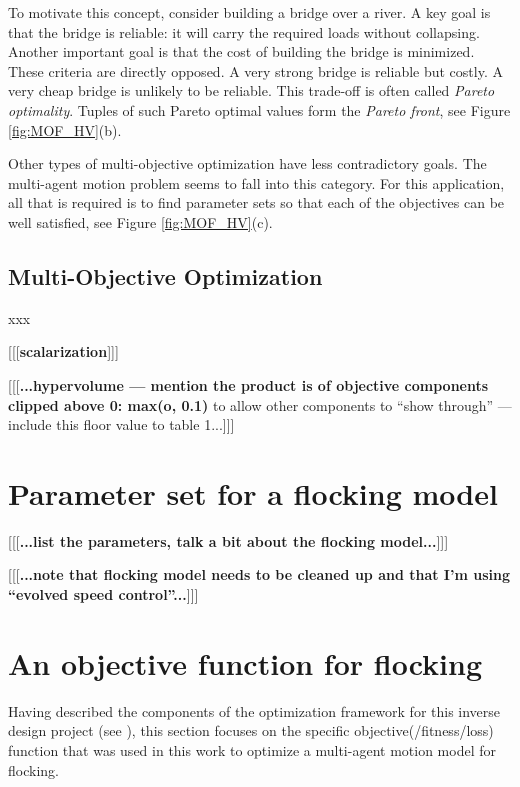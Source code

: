 \documentclass[letterpaper]{article}
\begin{document}
To motivate this concept, consider building a bridge over a river. A key goal is that the bridge is reliable: it will carry the required loads without collapsing. Another important goal is that the cost of building the bridge is minimized. These criteria are directly opposed. A very strong bridge is reliable but costly. A very cheap bridge is unlikely to be reliable. This trade-off is often called \textit{Pareto optimality}. Tuples of such Pareto optimal values form the \textit{Pareto front}, see Figure \ref{fig:MOF_HV}(b).

Other types of multi-objective optimization have less contradictory goals. The multi-agent motion problem seems to fall into this category. For this application, all that is required is to find parameter sets so that each of the objectives can be well satisfied, see Figure \ref{fig:MOF_HV}(c).

\subsection{Multi-Objective Optimization}
\label{subsec:Multi-Objective}

xxx

[[[\textbf{scalarization}]]]

[[[\textbf{...hypervolume --- mention the product is of objective components clipped above 0: max(o, 0.1)} to allow other components to ``show through'' --- include this floor value to table 1...]]]

\section{Parameter set for a flocking model}
\label{sec:parameter_set}

[[[\textbf{...list the parameters, talk a bit about the flocking model...}]]]

[[[\textbf{...note that flocking model needs to be cleaned up and that I'm using ``evolved speed control''...}]]]

\section{An objective function for flocking}
\label{sec:FlockingObjective}

Having described the components of the optimization framework for this inverse design project (see ), this section focuses on the specific objective(/fitness/loss) function that was used in this work to optimize a multi-agent motion model for flocking.
\end{document}
